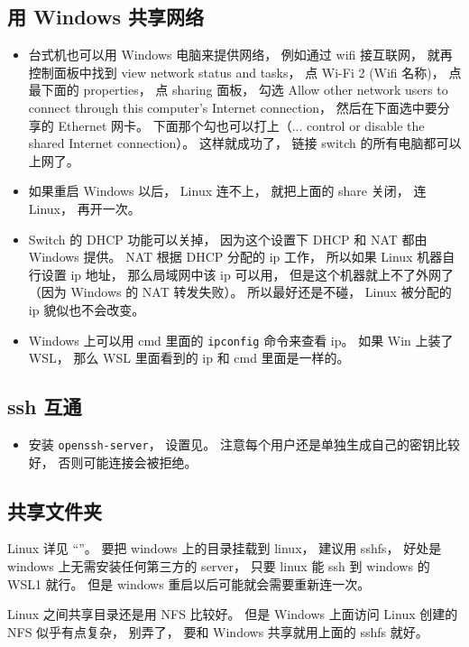 \subsection{用 Windows 共享网络}
\begin{itemize}
\item 台式机也可以用 Windows 电脑来提供网络， 例如通过 wifi 接互联网， 就再控制面板中找到 view network status and tasks， 点 Wi-Fi 2 (Wifi 名称)， 点最下面的 properties， 点 sharing 面板， 勾选 Allow other network users to connect through this computer's Internet connection， 然后在下面选中要分享的 Ethernet 网卡。 下面那个勾也可以打上（... control or disable the shared Internet connection）。 这样就成功了， 链接 switch 的所有电脑都可以上网了。
\item 如果重启 Windows 以后， Linux 连不上， 就把上面的 share 关闭， 连 Linux， 再开一次。
\item Switch 的 DHCP 功能可以关掉， 因为这个设置下 DHCP 和 NAT 都由 Windows 提供。 NAT 根据 DHCP 分配的 ip 工作， 所以如果 Linux 机器自行设置 ip 地址， 那么局域网中该 ip 可以用， 但是这个机器就上不了外网了（因为 Windows 的 NAT 转发失败）。 所以最好还是不碰， Linux 被分配的 ip 貌似也不会改变。
\item Windows 上可以用 cmd 里面的 \verb|ipconfig| 命令来查看 ip。 如果 Win 上装了 WSL， 那么 WSL 里面看到的 ip 和 cmd 里面是一样的。
\end{itemize}

\subsection{ssh 互通}
\begin{itemize}
\item 安装 \verb|openssh-server|， 设置见。 注意每个用户还是单独生成自己的密钥比较好， 否则可能连接会被拒绝。
\end{itemize}

\subsection{共享文件夹}
Linux 详见 “”。 要把 windows 上的目录挂载到 linux， 建议用 sshfs， 好处是 windows 上无需安装任何第三方的 server， 只要 linux 能 ssh 到 windows 的 WSL1 就行。 但是 windows 重启以后可能就会需要重新连一次。

Linux 之间共享目录还是用 NFS 比较好。 但是 Windows 上面访问 Linux 创建的 NFS 似乎有点复杂， 别弄了， 要和 Windows 共享就用上面的 sshfs 就好。

